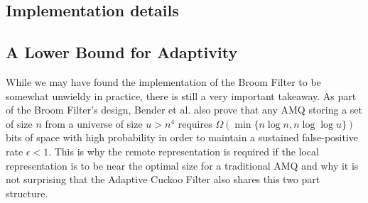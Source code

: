 \documentclass[../paper.tex]{subfiles}
\begin{document}
\subsection{Implementation details}



\subsection{A Lower Bound for Adaptivity} While we may have found the
implementation of the Broom Filter to be somewhat unwieldy in practice, there
is still a very important takeaway.  As part of the Broom Filter's design,
Bender et al. also prove that any AMQ storing a set of size $n$ from a universe
of size $u > n^4$ requires $\Omega (\min \{n\log n, n\log\log u\})$ bits of
space with high probability in order to maintain a sustained false-positive
rate $\epsilon < 1$.  This is why the remote representation is required if the
local representation is to be near the optimal size for a traditional AMQ and
why it is not surprising that the Adaptive Cuckoo Filter also shares this two
part structure.  
\end{document}
